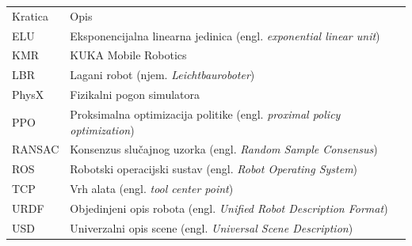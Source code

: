 \begin{tabular}{@{}p{}p{}@{}}
    \toprule
    Kratica & Opis                                                                            \\
    ELU     & Eksponencijalna linearna jedinica (engl. \textit{exponential linear unit})      \\
    KMR     & KUKA Mobile Robotics                                                            \\
    LBR     & Lagani robot (njem. \textit{Leichtbauroboter})                                  \\
    PhysX   & Fizikalni pogon simulatora                                                      \\
    PPO     & Proksimalna optimizacija politike (engl. \textit{proximal policy optimization}) \\
    RANSAC  & Konsenzus slučajnog uzorka (engl. \textit{Random Sample Consensus})             \\
    ROS     & Robotski operacijski sustav (engl. \textit{Robot Operating System})             \\
    TCP     & Vrh alata (engl. \textit{tool center point})                                    \\
    URDF    & Objedinjeni opis robota (engl. \textit{Unified Robot Description Format})       \\
    USD     & Univerzalni opis scene (engl. \textit{Universal Scene Description})             \\
    \bottomrule
\end{tabular}
\clearpage
